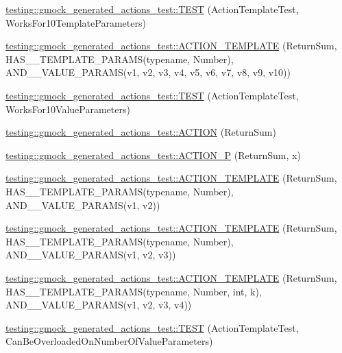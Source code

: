 \begin{DoxyCompactItemize}
\item 
\hyperlink{namespacetesting_1_1gmock__generated__actions__test_a39707e50b998b0866ea7dec54099f38f}{testing\+::gmock\+\_\+generated\+\_\+actions\+\_\+test\+::\+T\+E\+ST} (Action\+Template\+Test, Works\+For10\+Template\+Parameters)
\item 
\hyperlink{namespacetesting_1_1gmock__generated__actions__test_a0e21a6c1f43a7125a29e6e1edcd7006c}{testing\+::gmock\+\_\+generated\+\_\+actions\+\_\+test\+::\+A\+C\+T\+I\+O\+N\+\_\+\+T\+E\+M\+P\+L\+A\+TE} (Return\+Sum, H\+A\+S\+\_\+\_\+\+T\+E\+M\+P\+L\+A\+T\+E\+\_\+\+P\+A\+R\+A\+MS(typename, Number), A\+N\+D\+\_\+\_\+\+V\+A\+L\+U\+E\+\_\+\+P\+A\+R\+A\+MS(v1, v2, v3, v4, v5, v6, v7, v8, v9, v10))
\item 
\hyperlink{namespacetesting_1_1gmock__generated__actions__test_aa8dd9ea1777fe67626bab2815b7261f4}{testing\+::gmock\+\_\+generated\+\_\+actions\+\_\+test\+::\+T\+E\+ST} (Action\+Template\+Test, Works\+For10\+Value\+Parameters)
\item 
\hyperlink{namespacetesting_1_1gmock__generated__actions__test_a49c180470c75de1ab88cd2928e738d33}{testing\+::gmock\+\_\+generated\+\_\+actions\+\_\+test\+::\+A\+C\+T\+I\+ON} (Return\+Sum)
\item 
\hyperlink{namespacetesting_1_1gmock__generated__actions__test_acae7628c76df0e3b54ea80459fe3cf60}{testing\+::gmock\+\_\+generated\+\_\+actions\+\_\+test\+::\+A\+C\+T\+I\+O\+N\+\_\+P} (Return\+Sum, x)
\item 
\hyperlink{namespacetesting_1_1gmock__generated__actions__test_a0d95dcce021580cf2a2af2a91348a01b}{testing\+::gmock\+\_\+generated\+\_\+actions\+\_\+test\+::\+A\+C\+T\+I\+O\+N\+\_\+\+T\+E\+M\+P\+L\+A\+TE} (Return\+Sum, H\+A\+S\+\_\+\_\+\+T\+E\+M\+P\+L\+A\+T\+E\+\_\+\+P\+A\+R\+A\+MS(typename, Number), A\+N\+D\+\_\+\_\+\+V\+A\+L\+U\+E\+\_\+\+P\+A\+R\+A\+MS(v1, v2))
\item 
\hyperlink{namespacetesting_1_1gmock__generated__actions__test_a5241672e22af49093d3601ac42c9a5ca}{testing\+::gmock\+\_\+generated\+\_\+actions\+\_\+test\+::\+A\+C\+T\+I\+O\+N\+\_\+\+T\+E\+M\+P\+L\+A\+TE} (Return\+Sum, H\+A\+S\+\_\+\_\+\+T\+E\+M\+P\+L\+A\+T\+E\+\_\+\+P\+A\+R\+A\+MS(typename, Number), A\+N\+D\+\_\+\_\+\+V\+A\+L\+U\+E\+\_\+\+P\+A\+R\+A\+MS(v1, v2, v3))
\item 
\hyperlink{namespacetesting_1_1gmock__generated__actions__test_a03e55dabaa60ff2cda602c702ef3ff76}{testing\+::gmock\+\_\+generated\+\_\+actions\+\_\+test\+::\+A\+C\+T\+I\+O\+N\+\_\+\+T\+E\+M\+P\+L\+A\+TE} (Return\+Sum, H\+A\+S\+\_\+\_\+\+T\+E\+M\+P\+L\+A\+T\+E\+\_\+\+P\+A\+R\+A\+MS(typename, Number, int, k), A\+N\+D\+\_\+\_\+\+V\+A\+L\+U\+E\+\_\+\+P\+A\+R\+A\+MS(v1, v2, v3, v4))
\item 
\hyperlink{namespacetesting_1_1gmock__generated__actions__test_aa84c5b4f29e052340459e12649ce7209}{testing\+::gmock\+\_\+generated\+\_\+actions\+\_\+test\+::\+T\+E\+ST} (Action\+Template\+Test, Can\+Be\+Overloaded\+On\+Number\+Of\+Value\+Parameters)
\end{DoxyCompactItemize}
